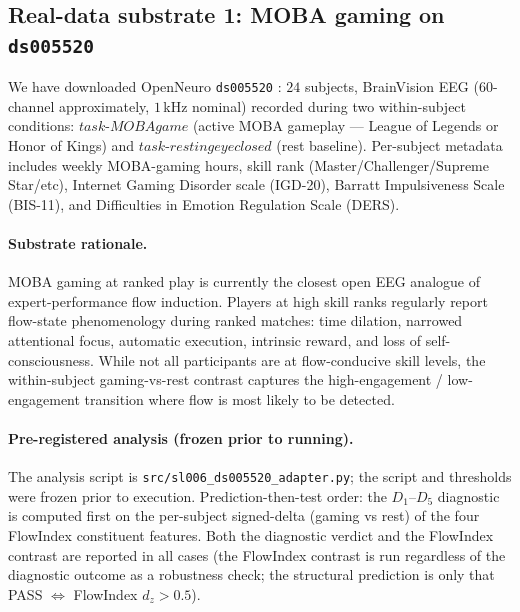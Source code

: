 \documentclass[11pt,a4paper]{article}
\begin{document}
\subsection{Real-data substrate 1: MOBA gaming on \texttt{ds005520}}\label{sec:results-moba}

We have downloaded OpenNeuro \texttt{ds005520} \citep{LiMOBA2024}: $24$ subjects, BrainVision EEG ($60$-channel approximately, $1$\,kHz nominal) recorded during two within-subject conditions: $task\text{-}MOBAgame$ (active MOBA gameplay --- League of Legends or Honor of Kings) and $task\text{-}restingeyeclosed$ (rest baseline). Per-subject metadata includes weekly MOBA-gaming hours, skill rank (Master/Challenger/Supreme Star/etc), Internet Gaming Disorder scale (IGD-20), Barratt Impulsiveness Scale (BIS-11), and Difficulties in Emotion Regulation Scale (DERS).

\paragraph{Substrate rationale.} MOBA gaming at ranked play is currently the closest open EEG analogue of expert-performance flow induction. Players at high skill ranks regularly report flow-state phenomenology during ranked matches: time dilation, narrowed attentional focus, automatic execution, intrinsic reward, and loss of self-consciousness. While not all participants are at flow-conducive skill levels, the within-subject gaming-vs-rest contrast captures the high-engagement / low-engagement transition where flow is most likely to be detected.

\paragraph{Pre-registered analysis (frozen prior to running).} The analysis script is \texttt{src/sl006\_ds005520\_adapter.py}; the script and thresholds were frozen prior to execution. Prediction-then-test order: the $D_1$--$D_5$ diagnostic is computed first on the per-subject signed-delta (gaming vs rest) of the four FlowIndex constituent features. Both the diagnostic verdict and the FlowIndex contrast are reported in all cases (the FlowIndex contrast is run regardless of the diagnostic outcome as a robustness check; the structural prediction is only that PASS $\Leftrightarrow$ FlowIndex $d_z > 0.5$).
\end{document}
